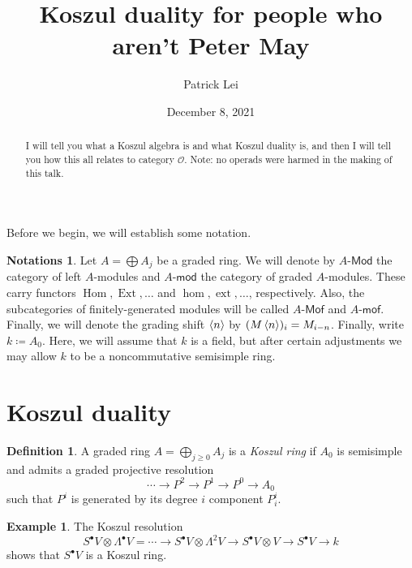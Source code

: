 \documentclass{amsart}
\title{Koszul duality for people who aren't Peter May}
\author{Patrick Lei}
\date{December 8, 2021}
\theoremstyle{definition}
\newtheorem{defn}[thm]{Definition}
\newtheorem{exm}[thm]{Example}
\newtheorem{notns}[thm]{Notations}
\theoremstyle{remark}
\theoremstyle{plain}
\theoremstyle{definition}
\theoremstyle{remark}
\newcommand{\cO}{\mathcal{O}}
\newcommand{\ms}[1]{\mathsf{#1}}
\DeclareMathOperator{\Hom}{Hom}
\DeclareMathOperator{\Ext}{Ext}
\DeclareMathOperator{\ext}{ext}
\begin{document}
    
\maketitle

\begin{abstract}
    I will tell you what a Koszul algebra is and what Koszul duality is, and then I will tell you how this all relates to category $\cO$. Note: no operads were harmed in the making of this talk.
\end{abstract}

Before we begin, we will establish some notation.
\begin{notns}
    Let $A = \bigoplus A_j$ be a graded ring. We will denote by $A\text{-}\ms{Mod}$ the category of left $A$-modules and $A\text{-}\ms{mod}$ the category of graded $A$-modules. These carry functors $\Hom, \Ext, \ldots$ and $\hom, \ext, \ldots$, respectively. Also, the subcategories of finitely-generated modules will be called $A\text{-}\ms{Mof}$ and $A\text{-}\ms{mof}$. Finally, we will denote the grading shift $\ev{n}$ by $(M\ev{n})_i = M_{i-n}$. Finally, write $k \coloneqq A_0$. Here, we will assume that $k$ is a field, but after certain adjustments we may allow $k$ to be a noncommutative semisimple ring.
\end{notns}

\section{Koszul duality}%
\label{sec:koszul_duality}

\begin{defn}
    A graded ring $A = \bigoplus_{j \geq 0} A_j$ is a \textit{Koszul ring} if $A_0$ is semisimple and admits a graded projective resolution
    \[ \cdots \to P^2 \to P^1 \to P^0 \to A_0 \]
    such that $P^i$ is generated by its degree $i$ component $P^i_i$.
\end{defn}

\begin{exm}
    The Koszul resolution
    \[ S^{\bullet} V \otimes \Lambda^{\bullet} V = \cdots \to S^{\bullet} V \otimes \Lambda^2 V \to S^{\bullet} V \otimes V \to S^{\bullet} V \to k \]
    shows that $S^{\bullet} V$ is a Koszul ring.
\end{exm}
\end{document}
